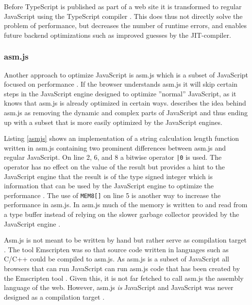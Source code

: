 

Before TypeScript is published as part of a web site it is transformed to regular JavaScript using the TypeScript compiler \parencite{ReiserBlaser2017}. This does thus not directly solve the problem of performance, but decreases the number of runtime errors, and enables future backend optimizations such as improved guesses by the JIT-compiler.

\subsubsection{asm.js}

Another approach to optimize JavaScript is asm.js which is a subset of JavaScript focused on performance \parencite{Zakai2018}. If the browser understands asm.js it will skip certain steps in the JavaScript engine designed to optimize ''normal'' JavaScript, as it knows that asm.js is already optimized in certain ways. \textcite{Zakai2018} describes the idea behind asm.js as removing the dynamic and complex parts of JavaScript and thus ending up with a subset that is more easily optimized by the JavaScript engines.



Listing \ref{asmjs} shows an implementation of a string calculation length function written in asm.js containing two prominent differences between asm.js and regular JavaScript. On line 2, 6, and 8 a bitwise operator \texttt{|0} is used. The operator has no effect on the value of the result but provides a hint to the JavaScript engine that the result is of the type signed integer which is information that can be used by the JavaScript engine to optimize the performance \parencite{Zakai2018}. The use of \texttt{MEM8[]} on line 5 is another way to increase the performance in asm.js. In asm.js much of the memory is written to and read from a type buffer instead of relying on the slower garbage collector provided by the JavaScript engine \parencite{Zakai2011}.

Asm.js is not meant to be written by hand but rather serve as compilation target \parencite{VanEsNicolayStievenartDHondtDeRoover2016}. The tool Emscripten \parencite{Zakai2011} was so that source code written in languages such as C/C++ could be compiled to asm.js. As asm.js is a subset of JavaScript all browsers that can run JavaScript can run asm.js code that has been created by the Emscripten tool \parencite{HaasRossbergSchuffTitzerHolmanGohmanWagnerZakaiBastien2017}. Given this, it is not far fetched to call asm.js the assembly language of the web. However, asm.js \emph{is} JavaScript and JavaScript was never designed as a compilation target \parencite{Watt2018}.

